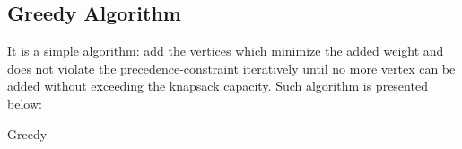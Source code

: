 \subsection{Greedy Algorithm}

It is a simple algorithm: add the vertices which minimize the added weight and does not violate the precedence-constraint iteratively until no more vertex can be added without exceeding the knapsack capacity. Such algorithm is presented below:

\begin{algorithm}[ht!]
    \caption{Greedy}
    \begin{algorithmic}[1]
        \Require{$\vertices, \edges, \weight, \maximumWeight$}
        \EndWhile
        \\
    \end{algorithmic}
    \label{algorithm:greedy}
\end{algorithm}

